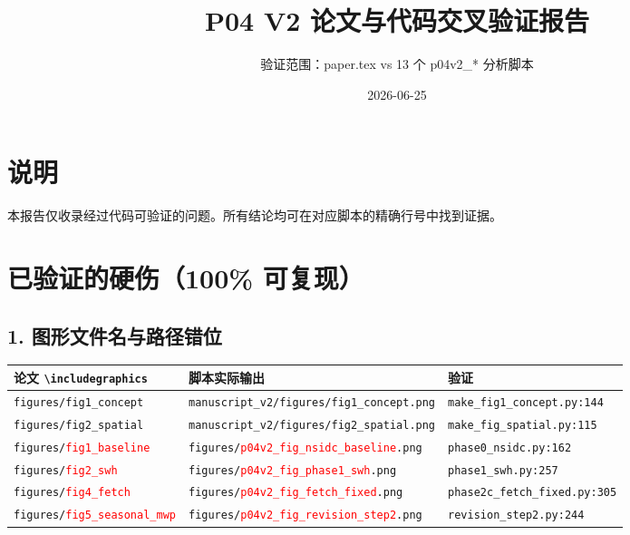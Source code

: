 \documentclass[11pt,a4paper]{article}
\begin{document}
\title{\textbf{P04 V2 论文与代码交叉验证报告}}
\author{验证范围：paper.tex vs 13 个 p04v2\_* 分析脚本}
\date{2026-06-25}

\maketitle

\section*{说明}
本报告仅收录经过代码可验证的问题。所有结论均可在对应脚本的精确行号中找到证据。

\vspace{0.5cm}

\section{已验证的硬伤（100\% 可复现）}

\subsection*{1. 图形文件名与路径错位}

\begin{tabularx}{\textwidth}{lXX}
\toprule
\textbf{论文 \texttt{\textbackslash includegraphics}} & \textbf{脚本实际输出} & \textbf{验证} \\
\midrule
\texttt{figures/fig1\_concept} & \texttt{manuscript\_v2/figures/fig1\_concept.png} & \texttt{make\_fig1\_concept.py:144} \\
\texttt{figures/fig2\_spatial} & \texttt{manuscript\_v2/figures/fig2\_spatial.png} & \texttt{make\_fig\_spatial.py:115} \\
\texttt{figures/\textcolor{red}{fig1\_baseline}} & \texttt{figures/\textcolor{red}{p04v2\_fig\_nsidc\_baseline}.png} & \texttt{phase0\_nsidc.py:162} \\
\texttt{figures/\textcolor{red}{fig2\_swh}} & \texttt{figures/\textcolor{red}{p04v2\_fig\_phase1\_swh}.png} & \texttt{phase1\_swh.py:257} \\
\texttt{figures/\textcolor{red}{fig4\_fetch}} & \texttt{figures/\textcolor{red}{p04v2\_fig\_fetch\_fixed}.png} & \texttt{phase2c\_fetch\_fixed.py:305} \\
\texttt{figures/\textcolor{red}{fig5\_seasonal\_mwp}} & \texttt{figures/\textcolor{red}{p04v2\_fig\_revision\_step2}.png} & \texttt{revision\_step2.py:244} \\
\bottomrule
\end{tabularx}
\end{document}
